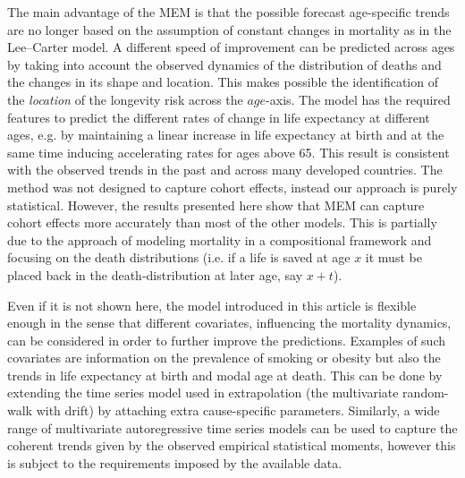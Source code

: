 \documentclass[T0_MEM]{subfiles}
\begin{document}
The main advantage of the MEM is that the possible forecast age-specific trends are no longer based on the assumption of constant changes in mortality as in the Lee--Carter model. A different speed of improvement can be predicted across ages by taking into account the observed dynamics of the distribution of deaths and the changes in its shape and location. This makes possible the identification of the \emph{location} of the longevity risk across the $age$-axis. The model has the required features to predict the different rates of change in life expectancy at different ages, e.g. by maintaining a linear increase in life expectancy at birth and at the same time inducing accelerating rates for ages above 65. This result is consistent with the observed trends in the past and across many developed countries. The method was not designed to capture cohort effects, instead our approach is purely statistical. However, the results presented here show that MEM can capture cohort effects more accurately than most of the other models. This is partially due to the approach of modeling mortality in a compositional framework and focusing on the death distributions (i.e. if a life is saved at age $x$ it must be placed back in the death-distribution at later age, say $x + t$).

Even if it is not shown here, the model introduced in this article is flexible enough in the sense that different covariates, influencing the mortality dynamics, can be considered in order to further improve the predictions. Examples of such covariates are information on the prevalence of smoking or obesity but also the trends in life expectancy at birth and modal age at death. This can be done by extending the time series model used in extrapolation (the multivariate random-walk with drift) by attaching extra cause-specific parameters. Similarly, a wide range of multivariate autoregressive time series models can be used to capture the coherent trends given by the observed empirical statistical moments, however this is subject to the requirements imposed by the available data.
\end{document}
